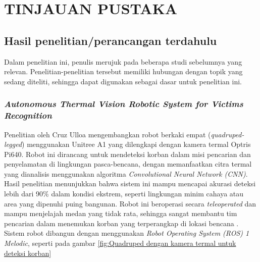 \chapter{TINJAUAN PUSTAKA}
\label{chap:tinjauanpustaka}


\section{Hasil penelitian/perancangan terdahulu}
Dalam penelitian ini, penulis merujuk pada beberapa studi sebelumnya yang relevan. Penelitian-penelitian tersebut memiliki hubungan dengan topik yang sedang diteliti, sehingga dapat digunakan sebagai dasar untuk penelitian ini.

\subsection{\emph{Autonomous Thermal Vision Robotic System for Victims Recognition}}

Penelitian oleh Cruz Ulloa mengembangkan robot berkaki empat (\emph{quadruped-legged}) menggunakan Unitree A1 yang dilengkapi dengan kamera termal Optris Pi640. Robot ini dirancang untuk mendeteksi korban dalam misi pencarian dan penyelamatan di lingkungan pasca-bencana, dengan memanfaatkan citra termal yang dianalisis menggunakan algoritma \emph{Convolutional Neural Network (CNN)}. Hasil penelitian menunjukkan bahwa sistem ini mampu mencapai akurasi deteksi lebih dari 90\% dalam kondisi ekstrem, seperti lingkungan minim cahaya atau area yang dipenuhi puing bangunan. Robot ini beroperasi secara \emph{teleoperated} dan mampu menjelajah medan yang tidak rata, sehingga sangat membantu tim pencarian dalam menemukan korban yang terperangkap di lokasi bencana \cite{Cruz2021}. Sistem robot dibangun dengan menggunakan \emph{Robot Operating System (ROS) 1 Melodic}, seperti pada gambar \ref{fig:Quadruped dengan kamera termal untuk deteksi korban}

